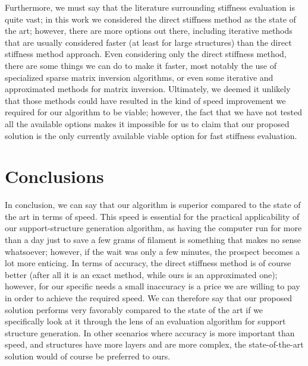 Furthermore, we must say that the literature surrounding stiffness evaluation is quite vast;
in this work we considered the direct stiffness method as the state of the art; however, there
are more options out there, including iterative methods that are usually considered faster (at least for large
structures) than the direct stiffness method approach. Even considering only the direct
stiffness method, there are some things we can do to make it faster, most notably the use of specialized
sparse matrix inversion algorithms, or even some iterative and approximated methods for matrix inversion.
Ultimately, we deemed it unlikely that those methods could have resulted in the kind of speed improvement
we required for our algorithm to be viable; however, the fact that we have not tested all the available
options makes it impossible for us to claim that our proposed solution is the only currently available viable option
for fast stiffness evaluation.

\section{Conclusions}

In conclusion, we can say that our algorithm is superior compared to the state of the art in terms of speed.
This speed is essential for the practical applicability of our support-structure generation algorithm,
as having the computer run for more than a day just to save a few grams of filament is something 
that makes no sense whatsoever; however, if the wait was only a few minutes, the prospect becomes a lot more enticing.
In terms of accuracy, the direct stiffness method is of course better (after all it is an exact
method, while ours is an approximated one); however, for our specific needs a small inaccuracy is a price
we are willing to pay in order to achieve the required speed.
We can therefore say that our proposed solution performs very favorably compared to the state of the art
if we specifically look at it through the lens of an evaluation algorithm for support structure generation.
In other scenarios where accuracy is more important than speed, and structures have more layers and are more
complex, the state-of-the-art solution would of course be preferred to ours.
